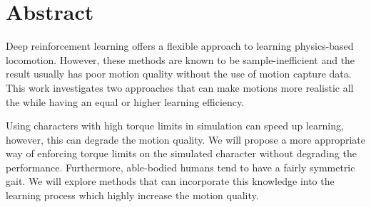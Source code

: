 
\chapter{Abstract}


Deep reinforcement learning offers a flexible approach to learning physics-based locomotion. However, these methods are known to be sample-inefficient and the result usually has poor motion quality without the use of motion capture data. This work investigates two approaches that can make motions more realistic all the while having an equal or higher learning efficiency.

Using characters with high torque limits in simulation can speed up learning, however, this can degrade the motion quality. We will propose a more appropriate way of enforcing torque limits on the simulated character without degrading the performance. Furthermore, able-bodied humans tend to have a fairly symmetric gait. We will explore methods that can incorporate this knowledge into the learning process which highly increase the motion quality.







